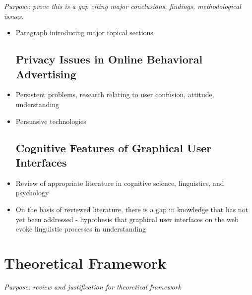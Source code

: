 \emph{Purpose: prove this is a gap citing major conclusions, findings, methodological issues.}

\begin{itemize}
\item Paragraph introducing major topical sections

\subsection{Privacy Issues in Online Behavioral Advertising}
\label{privacyissuesinonlinebehavioraladvertising}

\item Persistent problems, research relating to user confusion, attitude, understanding

\item Persuasive technologies

\subsection{Cognitive Features of Graphical User Interfaces}
\label{cognitivefeaturesofgraphicaluserinterfaces}

\item Review of appropriate literature in cognitive science, linguistics, and psychology

\item On the basis of reviewed literature, there is a gap in knowledge that has not yet been addressed - hypothesis that graphical user interfaces on the web evoke linguistic processes in understanding

\end{itemize}

\section{Theoretical Framework}
\label{theoreticalframework}

\emph{Purpose: review and justification for theoretical framework}


